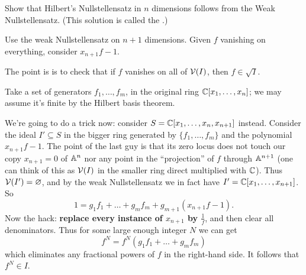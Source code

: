 \begin{problem}
	\yod
	\label{prob:hilbert_from_weak}
	Show that Hilbert's Nullstellensatz in $n$ dimensions
	follows from the Weak Nullstellensatz.
	(This solution is called the .)
	\begin{hint}
		Use the weak Nullstellensatz on $n+1$ dimensions.
		Given $f$ vanishing on everything,
		consider $x_{n+1}f-1$.
	\end{hint}
	\begin{sol}
		The point is is to check that if $f$ vanishes on all of $\mathcal V(I)$,
		then $f \in \sqrt I$.

		Take a set of generators $f_1, \dots, f_m$,
		in the original ring $\mathbb C[x_1, \dots, x_n]$;
		we may assume it's finite by the Hilbert basis theorem.

		We're going to do a trick now:
		consider $S = \mathbb C[x_1, \dots, x_n, x_{n+1}]$ instead.
		Consider the ideal $I' \subseteq S$ in the bigger ring
		generated by $\{f_1, \dots, f_m\}$ and the polynomial $x_{n+1} f - 1$.
		The point of the last guy is that its zero locus
		does not touch our copy $x_{n+1}=0$ of $\mathbb A^n$
		nor any point in the ``projection'' of $f$ through $\mathbb A^{n+1}$
		(one can think of this as $\mathcal V(I)$ in the smaller ring
		direct multiplied with $\mathbb C$).
		Thus $\mathcal V(I') = \varnothing$, and by the weak Nullstellensatz
		we in fact have $I' = \mathbb C[x_1, \dots, x_{n+1}]$.
		So
		\[ 1 = g_1f_1 + \dots + g_mf_m + g_{m+1} \left( x_{n+1}f-1 \right). \]
		Now the hack: \textbf{replace every instance of $x_{n+1}$ by $\frac 1f$},
		and then clear all denominators.
		Thus for some large enough integer $N$ we can get
		\[ f^N = f^N(g_1f_1 + \dots + g_mf_m) \]
		which eliminates any fractional powers of $f$ in the right-hand side.
		It follows that $f^N \in I$.
	\end{sol}
\end{problem}
